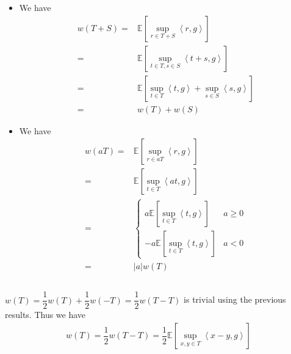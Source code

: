 \documentclass[11pt,a4paper]{ctexart}
\numberwithin{equation}{section}%
\begin{document}
\begin{itemize}[topsep=2pt,itemsep=0pt]
    \item We have
    \begin{align*}
        w(T+S)=& \mathbb{E}\left[ \mathop{ \sup  }\limits_{r\in T+S} \left\langle r, g \right\rangle  \right]  \\ 
        =& \mathbb{E}\left[ \mathop{ \sup  }\limits_{t\in T, s\in S} \left\langle t+s, g \right\rangle  \right]  \\
        =& \mathbb{E}\left[ \mathop{ \sup  }\limits_{t\in T} \left\langle t, g  \right\rangle + \mathop{ \sup  }\limits_{s\in S} \left\langle s, g \right\rangle  \right]  \\
        =& w(T) + w(S)
    \end{align*}
    \item We have
    \begin{align*}
        w(aT)=& \mathbb{E}\left[ \mathop{ \sup  }\limits_{r\in aT} \left\langle r, g \right\rangle  \right]  \\
        =& \mathbb{E}\left[ \mathop{ \sup  }\limits_{t\in T} \left\langle at, g \right\rangle  \right]  \\
        =&\begin{cases}
            a\mathbb{E}\left[ \mathop{ \sup  }\limits_{t\in T} \left\langle t, g \right\rangle  \right]  & a\geq 0\\
            -a\mathbb{E}\left[ \mathop{ \sup  }\limits_{t\in T} \left\langle t, g \right\rangle  \right]  & a<0
        \end{cases} \\
        =& \left\vert a  \right\vert w(T)
    \end{align*}
    
    
    
    
\end{itemize}

\subsection{}
$ w(T) = \dfrac{ 1 }{ 2 }w(T)+\dfrac{ 1 }{ 2 }  w(-T) = \dfrac{ 1 }{ 2 }w(T-T) $ is trivial using the previous results. Thus we have
\begin{align*}
    w(T) = \dfrac{ 1 }{ 2 }w(T-T) = \dfrac{ 1 }{ 2 }\mathbb{E}\left[ \mathop{ \sup  }\limits_{x,y\in T } \left\langle x-y,g  \right\rangle  \right] 
\end{align*}


\subsection{}
\end{document}

